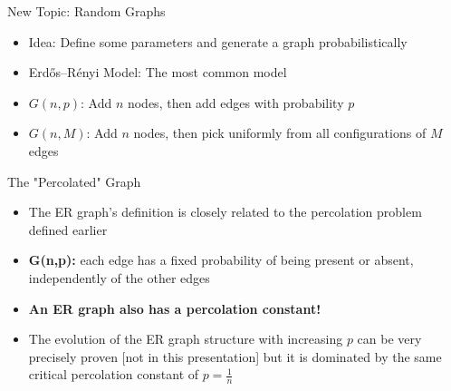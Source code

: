 \documentclass[aspectratio=169, handout]{beamer}
\begin{document}
\begin{frame}{New Topic: Random Graphs \cite{ERgraph}}
\begin{itemize}
\item \textcolor{sigma@mainblue}{Idea:} Define some parameters and generate a graph probabilistically
\pause
\item \textcolor{sigma@mainblue}{Erdős–Rényi Model:} The most common model
\item $G(n,p)$: Add $n$ nodes, then add edges with probability $p$
\item $G(n,M)$: Add $n$ nodes, then pick uniformly from all configurations of $M$ edges
\end{itemize}
\end{frame}

\begin{frame}{The "Percolated" Graph}
\begin{itemize}
\item The ER graph's definition is closely related to the percolation problem defined earlier
\pause
\item \textbf{G(n,p):} each edge has a fixed probability of being present or absent, independently of the other edges
\pause
\item \textbf{An ER graph also has a percolation constant!}
\pause
\item The evolution of the ER graph structure with increasing $p$ can be very precisely proven [not in this presentation] but it is dominated by the same critical percolation constant of $p = \frac{1}{n}$
\end{itemize}
\end{frame}
\end{document}
